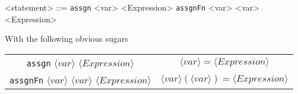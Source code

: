 \documentclass[../main.tex]{subfiles}
\begin{document}
\begin{grammar}
  <statement> ::= \texttt{assgn} <var> <Expression> \alt \texttt{assgnFn} <var> <var> <Expression>
\end{grammar}

With the following obvious sugars

\begin{tabular}{ c c }
  \texttt{assgn} $\langle var \rangle$ $\langle Expression \rangle$ & $\langle var \rangle = \langle Expression \rangle$ \\
  \texttt{assgnFn} $\langle var \rangle$ $\langle var \rangle$ $\langle Expression \rangle$ & $\langle var \rangle (\langle var \rangle) = \langle Expression \rangle$
\end{tabular}
\end{document}
